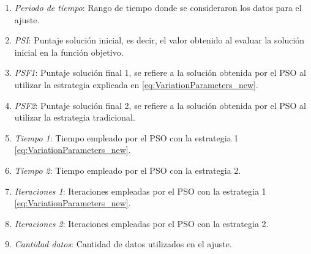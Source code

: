 \begin{enumerate}
    \item \emph{Periodo de tiempo}: Rango de tiempo donde se consideraron los datos para el ajuste.
    \item \emph{PSI}: Puntaje solución inicial, es decir, el valor obtenido al evaluar la solución inicial en la función objetivo.
    \item \emph{PSF1}: Puntaje solución final 1, se refiere a la solución obtenida por el PSO al utilizar la estrategia explicada en \ref{eq:VariationParameters_new}.
    \item \emph{PSF2}:  Puntaje solución final 2, se refiere a la solución obtenida por el PSO al utilizar la estrategia tradicional.
    \item \emph{Tiempo 1}: Tiempo empleado por el PSO con la estrategia 1 \ref{eq:VariationParameters_new}. 
    \item \emph{Tiempo 2}: Tiempo empleado por el PSO con la estrategia 2. 
    \item \emph{Iteraciones 1}: Iteraciones empleadas por el PSO con la estrategia 1 \ref{eq:VariationParameters_new}. 
    \item \emph{Iteraciones 2}: Iteraciones empleadas por el PSO con la estrategia 2. 
    \item \emph{Cantidad datos}: Cantidad de datos utilizados en el ajuste.
\end{enumerate}

